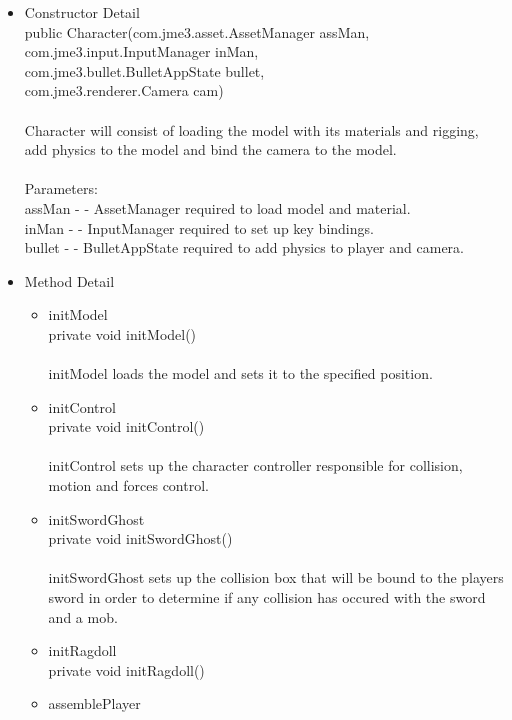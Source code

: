 \documentclass[letterpaper]{article}
\begin{document}
\begin{itemize}
\begin{itemize}
								\end{itemize}
						\item	Constructor Detail \\
								public Character(com.jme3.asset.AssetManager assMan, \\
        com.jme3.input.InputManager inMan, \\
        com.jme3.bullet.BulletAppState bullet, \\
        com.jme3.renderer.Camera cam) \\ \\
								Character will consist of loading the model with its materials and rigging, add physics to the model and bind the camera to the model. \\ \\
								Parameters: \\
								assMan - - AssetManager required to load model and material. \\
								inMan - - InputManager required to set up key bindings. \\
								bullet - - BulletAppState required to add physics to player and camera.
						\item	Method Detail 
								\begin{itemize}
									\item	initModel \\
											private void initModel() \\ \\
											initModel loads the model and sets it to the specified position. \\
									\item	initControl \\
											private void initControl() \\ \\
											initControl sets up the character controller responsible for collision, motion and forces control.
									\item	initSwordGhost \\
											private void initSwordGhost() \\ \\
											initSwordGhost sets up the collision box that will be bound to the players sword in order to determine if any collision has occured with the sword and a mob.
									\item	initRagdoll \\
											private void initRagdoll() \\
									\item	assemblePlayer \\

\end{itemize}
\end{itemize}
\end{document}
